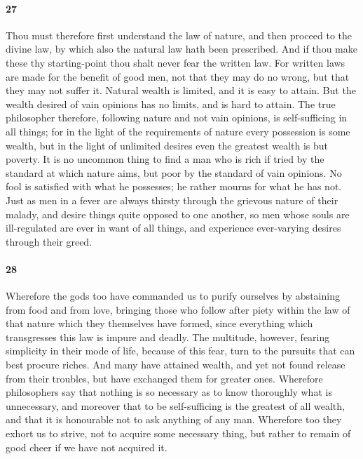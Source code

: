 \documentclass[12pt]{article}
\begin{document}
\paragraph{27} Thou must therefore first understand the law of nature, and then
proceed to the divine law, by which also the natural law hath been prescribed.
And if thou make these thy starting-point thou shalt never fear the written
law. For written laws are made for the benefit of good men, not that they may
do no wrong, but that they may not suffer it. Natural wealth is limited, and it
is easy to attain. But the wealth desired of vain opinions has no limits, and
is hard to attain. The true philosopher therefore, following nature and not
vain opinions, is self-sufficing in all things; for in the light of the
requirements of nature every possession is some wealth, but in the light of
unlimited desires even the greatest wealth is but poverty. It is no uncommon
thing to find a man who is rich if tried by the standard at which nature aims,
but poor by the standard of vain opinions. No fool is satisfied with what he
possesses; he rather mourns for what he has not. Just as men in a fever are
always thirsty through the grievous nature of their malady, and desire things
quite opposed to one another, so men whose souls are ill-regulated are ever in
want of all things, and experience ever-varying desires through their greed.

\paragraph{28} Wherefore the gods too have commanded us to purify ourselves by
abstaining from food and from love, bringing those who follow after piety
within the law of that nature which they themselves have formed, since
everything which transgresses this law is impure and deadly. The multitude,
however, fearing simplicity in their mode of life, because of this fear, turn
to the pursuits that can best procure riches. And many have attained wealth,
and yet not found release from their troubles, but have exchanged them for
greater ones. Wherefore philosophers say that nothing is so necessary as to
know thoroughly what is unnecessary, and moreover that to be self-sufficing is
the greatest of all wealth, and that it is honourable not to ask anything of
any man. Wherefore too they exhort us to strive, not to acquire some necessary
thing, but rather to remain of good cheer if we have not acquired it. 
\end{document}
